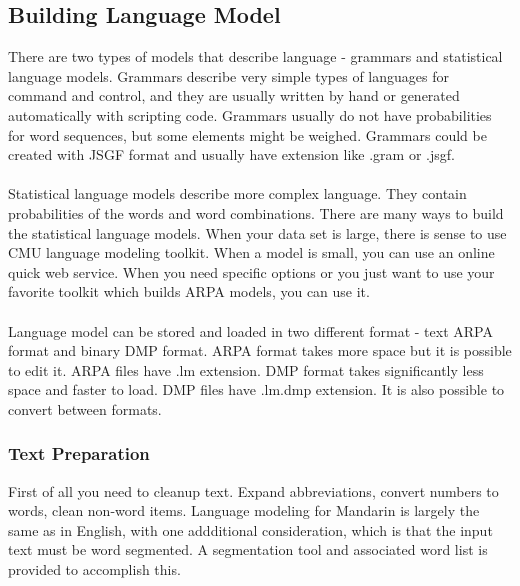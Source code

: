 \documentclass[12pt,a4paper,oldfontcommands]{memoir}
\begin{document}
\subsection{Building Language Model}


There are two types of models that describe language - grammars and statistical language models. Grammars describe very simple types of languages for command and control, and they are usually written by hand or generated automatically with scripting code. Grammars usually do not have probabilities for word sequences, but some elements might be weighed. Grammars could be created with JSGF format and usually have extension like .gram or .jsgf.\\\\
Statistical language models describe more complex language. They contain probabilities of the words and word combinations. There are many ways to build the statistical language models. When your data set is large, there is sense to use CMU language modeling toolkit. When a model is small, you can use an online quick web service. When you need specific options or you just want to use your favorite toolkit which builds ARPA models, you can use it.
\\\\
Language model can be stored and loaded in two different format - text ARPA format and binary DMP format. ARPA format takes more space but it is possible to edit it. ARPA files have .lm extension. DMP format takes significantly less space and faster to load. DMP files have .lm.dmp extension. It is also possible to convert between formats.

\subsubsection{Text Preparation}
First of all you need to cleanup text. Expand abbreviations, convert numbers to words, clean non-word items. Language modeling for Mandarin is largely the same as in English, with one addditional consideration, which is that the input text must be word segmented. A segmentation tool and associated word list is provided to accomplish this. 
\end{document}
